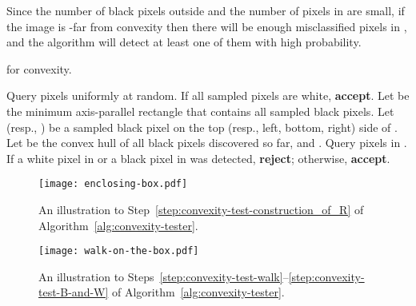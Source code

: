 \documentclass[11pt,english]{article}
\numberwithin{figure}{section}
\newcommand{\accept}{\textbf{accept}\xspace}
\newcommand{\reject}{\textbf{reject}\xspace}
\begin{document}
Since the number of black pixels outside  and the number of
pixels in  are small, if the image is -far from
convexity then there will be enough misclassified pixels in , and the algorithm
will detect at least one of them with high probability.

\begin{algorithm}\label{alg:convexity-tester}
\caption{ for convexity.}
\DontPrintSemicolon
\BlankLine
\nl\label{step:convexity-init}
Query  pixels uniformly at random.
If all sampled pixels are white, \accept.
\;
\nl \label{step:convexity-test-construction_of_R}
Let  be the minimum axis-parallel rectangle that contains all sampled black
pixels. Let  (resp., ) be a sampled black pixel on the
top (resp., left, bottom, right) side of .
\;
\nl\label{step:convexity-test-walk}
\nl\label{step:convexity-test-B-and-W}
Let  be the convex hull of all black pixels discovered so far, and
.\;
\nl\label{step:misclassified} Query  pixels in . If a white pixel in  or a
black pixel in  was detected, \reject; otherwise, \accept.\;
\end{algorithm}

\begin{figure}[ht]
\begin{minipage}[b]{0.45\linewidth}
\centering
\texttt{[image: enclosing-box.pdf]}
\caption{An illustration to Step~\ref{step:convexity-test-construction_of_R} of Algorithm~\ref{alg:convexity-tester}.}
\label{fig:enclosing-box}
\end{minipage}
\hspace{0.1\linewidth}
\begin{minipage}[b]{0.45\linewidth}
\centering
\texttt{[image: walk-on-the-box.pdf]}
\caption{An illustration to Steps~\ref{step:convexity-test-walk}--\ref{step:convexity-test-B-and-W} of Algorithm~\ref{alg:convexity-tester}.}
\label{fig:walk-on-the-box}
\end{minipage}
\end{figure}
\end{document}

